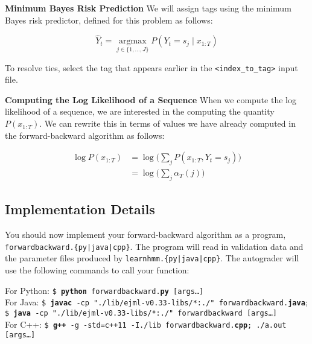\documentclass[11pt,addpoints,answers]{exam}
\newcommand \argmax {\operatorname*{argmax}}
\begin{document}
\textbf{Minimum Bayes Risk Prediction}
We will assign tags using the minimum Bayes risk predictor, defined for this problem as follows:

$$\hat{Y}_t = \argmax_{j\in \{1,\dots,J\}} P(Y_t = s_j \mid x_{1:T})$$

To resolve ties, select the tag that appears earlier in the \texttt{<index\_to\_tag>} input file.

\clearpage

\textbf{Computing the Log Likelihood of a Sequence}
When we compute the log likelihood of a sequence, we are interested in the computing the quantity $P(x_{1:T})$. We can rewrite this in terms of values we have already computed in the forward-backward algorithm as follows:

\begin{align*}
    \log{P(x_{1:T})} &= \log{\big(\sum_j P(x_{1:T},Y_t=s_j)\big)}\\
    &= \log{\big(\sum_j \alpha_T(j)\big)}
\end{align*}

\subsection{Implementation Details}

You should now implement your forward-backward algorithm as a program, \texttt{forwardbackward.\{py|java|cpp\}}. The program will read in validation data and the parameter files produced by \texttt{learnhmm.\{py|java|cpp\}}. The autograder will use the following commands to call your function:


\begin{tabbing}
For Python: \=\texttt{\$ \textbf{python} forwardbackward.\textbf{py} [args\dots]}\\
For Java: \>\texttt{\$ \textbf{javac} -cp "./lib/ejml-v0.33-libs/*:./" forwardbackward.\textbf{java}};\\ 
\>  \texttt{\$ \textbf{java} -cp "./lib/ejml-v0.33-libs/*:./" forwardbackward [args\dots]}\\
For C++: \>\texttt{\$ \textbf{g++} -g -std=c++11 -I./lib forwardbackward.\textbf{cpp}; ./a.out [args\dots]}\\
\end{tabbing}
\end{document}
